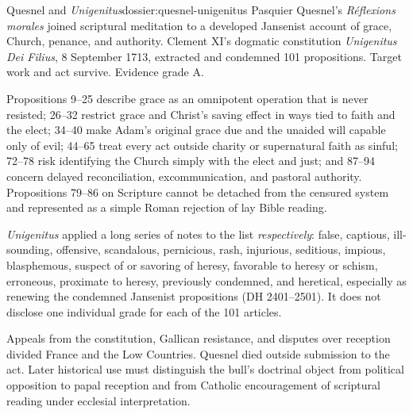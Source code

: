 \begin{heresydossier}{Quesnel and \emph{Unigenitus}}{dossier:quesnel-unigenitus}
\objectfield Pasquier Quesnel's \emph{R\'eflexions morales} joined scriptural meditation to a developed Jansenist account of grace, Church, penance, and authority. Clement XI's dogmatic constitution \emph{Unigenitus Dei Filius}, 8 September 1713, extracted and condemned 101 propositions. Target work and act survive. Evidence grade A.

\propositionfield Propositions 9--25 describe grace as an omnipotent operation that is never resisted; 26--32 restrict grace and Christ's saving effect in ways tied to faith and the elect; 34--40 make Adam's original grace due and the unaided will capable only of evil; 44--65 treat every act outside charity or supernatural faith as sinful; 72--78 risk identifying the Church simply with the elect and just; and 87--94 concern delayed reconciliation, excommunication, and pastoral authority. Propositions 79--86 on Scripture cannot be detached from the censured system and represented as a simple Roman rejection of lay Bible reading.

\responsefield \emph{Unigenitus} applied a long series of notes to the list \emph{respectively}: false, captious, ill-sounding, offensive, scandalous, pernicious, rash, injurious, seditious, impious, blasphemous, suspect of or savoring of heresy, favorable to heresy or schism, erroneous, proximate to heresy, previously condemned, and heretical, especially as renewing the condemned Jansenist propositions (DH 2401--2501). It does not disclose one individual grade for each of the 101 articles.

\aftermathfield Appeals from the constitution, Gallican resistance, and disputes over reception divided France and the Low Countries. Quesnel died outside submission to the act. Later historical use must distinguish the bull's doctrinal object from political opposition to papal reception and from Catholic encouragement of scriptural reading under ecclesial interpretation.
\end{heresydossier}

